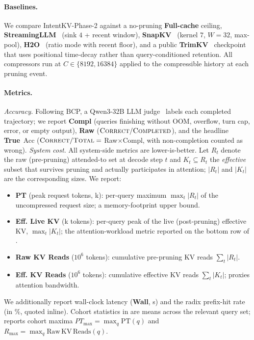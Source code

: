 \documentclass[11pt]{article}
\newcommand{\method}{IntentKV\xspace}
\newcommand{\learn}{Phase-2\xspace}
\begin{document}
\paragraph{Baselines.}
We compare \method-\learn against a no-pruning \textbf{Full-cache}
ceiling, \textbf{StreamingLLM}~\citep{xiao2024efficient} (sink $4$ +
recent window), \textbf{SnapKV}~\citep{li2024snapkv} (kernel $7$, $W{=}32$,
max-pool), \textbf{H2O}~\citep{zhang2023h2o} (ratio mode with recent floor),
and a public \textbf{TrimKV}~\citep{bui2025cache} checkpoint that uses
positional time-decay rather than query-conditioned retention. All
compressors run at $C\in\{8192,16384\}$ applied to the compressible
history at each pruning event.

\paragraph{Metrics.}
\emph{Accuracy.} Following BCP, a Qwen3-32B LLM
judge~\citep{zheng2023judging} labels each completed trajectory; we report \textbf{Compl} (queries finishing without OOM,
overflow, turn cap, error, or empty output), \textbf{Raw}
($\textsc{Correct}/\textsc{Completed}$), and the headline
\textbf{True}~Acc ($\textsc{Correct}/\textsc{Total}=$
Raw$\times$Compl, with non-completion counted as wrong).
\emph{System cost.} All system-side metrics are lower-is-better. Let
$R_t$ denote the raw (pre-pruning) attended-to set at decode step
$t$ and $K_t\subseteq R_t$ the \emph{effective} subset that survives
pruning and actually participates in attention; $|R_t|$ and $|K_t|$
are the corresponding sizes. We report:
\begin{itemize}[itemsep=1pt,parsep=0pt,topsep=2pt]
  \item \textbf{PT} (peak request tokens, k): per-query maximum
        $\max_t |R_t|$ of the uncompressed request size; a
        memory-footprint upper bound.
  \item \textbf{Eff. Live KV} (k tokens): per-query peak of the
        live (post-pruning) effective KV, $\max_t |K_t|$; the
        attention-workload metric reported on the bottom row of
        .
  \item \textbf{Raw KV Reads} ($10^{6}$ tokens): cumulative
        pre-pruning KV reads $\sum_t |R_t|$.
  \item \textbf{Eff. KV Reads} ($10^{6}$ tokens): cumulative
        effective KV reads $\sum_t |K_t|$; proxies attention
        bandwidth.
\end{itemize}
We additionally report wall-clock latency (\textbf{Wall}, s) and the
radix prefix-hit rate (in \%, quoted inline). Cohort statistics in
 are
means across the relevant query set; 
reports cohort maxima $PT_{\max}{=}\max_q \mathrm{PT}(q)$ and
$R_{\max}{=}\max_q \mathrm{Raw\,KV\,Reads}(q)$.
\end{document}
